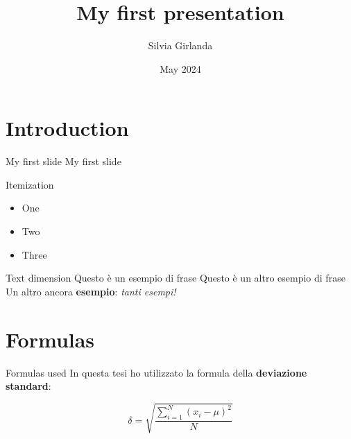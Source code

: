 \documentclass{beamer} %
\title{My first presentation}
\author{Silvia Girlanda}
\date{May 2024}
\begin{document}
\maketitle


\section{Introduction}

\begin{frame}{My first slide}
    My first slide
\end{frame}

\begin{frame}{Itemization} 
    \begin{itemize}
        \item One
        \item \pause Two %
        \item \pause Three 
    \end{itemize}
\end{frame}

\begin{frame}{Text dimension}
    \scriptsize{Questo è un esempio di frase} %
    \huge {Questo è un altro esempio di frase} \\ %
    Un altro ancora \textbf{esempio}: \textit{tanti esempi!} %
\end{frame} 

\section{Formulas}
\begin{frame}{Formulas used}
In questa tesi ho utilizzato la formula della \textbf{deviazione standard}:
\smallskip %

\begin{equation}
    \delta = \sqrt{\frac{\displaystyle\sum_{i=1}^N (x_i - \mu)^2}{N}} 
\end{equation}
    
\end{frame}
\end{document}
